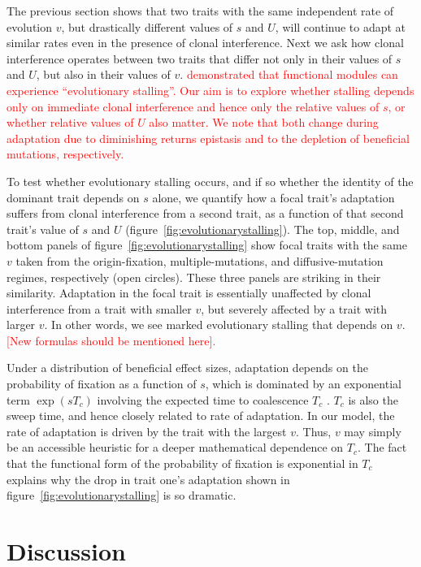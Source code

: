 \documentclass[9pt,twocolumn,twoside]{article}
\begin{document}
The previous section shows that two traits with the same independent rate of evolution $v$, but drastically different values of $s$ and $U$, will continue to adapt at similar rates even in the presence of clonal interference. Next we ask how clonal interference operates between two traits that differ not only in their values of $s$ and $U$, but also in their values of $v$. \citet{venkataram2019evolutionary} \textcolor{red}{demonstrated that functional modules can experience ``evolutionary stalling''. Our aim is to explore whether stalling depends only on immediate clonal interference and hence only the relative values of $s$, or whether relative values of $U$ also matter. We note that both change during adaptation due to diminishing returns epistasis and to the depletion of beneficial mutations, respectively.}

To test whether evolutionary stalling occurs, and if so whether the identity of the dominant trait depends on $s$ alone, we quantify how a focal trait's adaptation suffers from clonal interference from a second trait, as a function of that second trait's value of $s$ and $U$ (figure~\ref{fig:evolutionarystalling}). The top, middle, and bottom panels of figure~\ref{fig:evolutionarystalling} show focal traits with the same $v$ taken from the origin-fixation, multiple-mutations, and diffusive-mutation regimes, respectively (open circles). These three panels are striking in their similarity. Adaptation in the focal trait is essentially unaffected by clonal interference from a trait with smaller $v$, but severely affected by a trait with larger $v$. In other words, we see marked evolutionary stalling that depends on $v$. \textcolor{red}{[New formulas should be mentioned here].}

Under a distribution of beneficial effect sizes, adaptation depends on the probability of fixation as a function of $s$, which is dominated by an exponential term $\exp(sT_c)$ involving the expected time to coalescence $T_c$ \citep{good2012distribution,good2014deleterious}. $T_c$ is also the sweep time, and hence closely related to rate of adaptation. In our model, the rate of adaptation is driven by the trait with the largest $v$. Thus, $v$ may simply be an accessible heuristic for a deeper mathematical dependence on $T_c$. The fact that the functional form of the probability of fixation is exponential in $T_c$ explains why the drop in trait one's adaptation shown in figure~\ref{fig:evolutionarystalling} is so dramatic. 

\section{Discussion} \label{sec:discussion}
\end{document}
